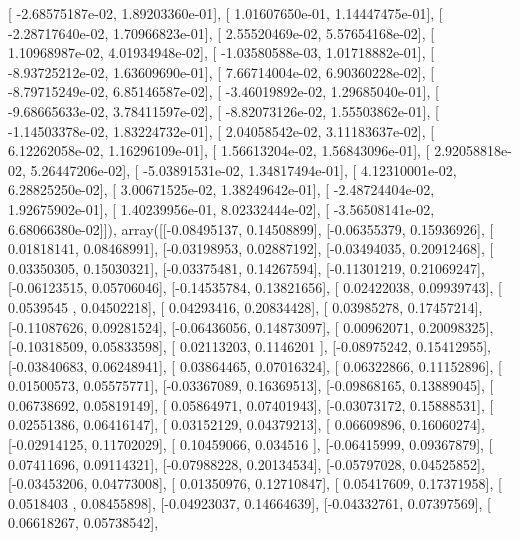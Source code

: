\documentclass{article}
\begin{document}
       [ -2.68575187e-02,   1.89203360e-01],
       [  1.01607650e-01,   1.14447475e-01],
       [ -2.28717640e-02,   1.70966823e-01],
       [  2.55520469e-02,   5.57654168e-02],
       [  1.10968987e-02,   4.01934948e-02],
       [ -1.03580588e-03,   1.01718882e-01],
       [ -8.93725212e-02,   1.63609690e-01],
       [  7.66714004e-02,   6.90360228e-02],
       [ -8.79715249e-02,   6.85146587e-02],
       [ -3.46019892e-02,   1.29685040e-01],
       [ -9.68665633e-02,   3.78411597e-02],
       [ -8.82073126e-02,   1.55503862e-01],
       [ -1.14503378e-02,   1.83224732e-01],
       [  2.04058542e-02,   3.11183637e-02],
       [  6.12262058e-02,   1.16296109e-01],
       [  1.56613204e-02,   1.56843096e-01],
       [  2.92058818e-02,   5.26447206e-02],
       [ -5.03891531e-02,   1.34817494e-01],
       [  4.12310001e-02,   6.28825250e-02],
       [  3.00671525e-02,   1.38249642e-01],
       [ -2.48724404e-02,   1.92675902e-01],
       [  1.40239956e-01,   8.02332444e-02],
       [ -3.56508141e-02,   6.68066380e-02]]), array([[-0.08495137,  0.14508899],
       [-0.06355379,  0.15936926],
       [ 0.01818141,  0.08468991],
       [-0.03198953,  0.02887192],
       [-0.03494035,  0.20912468],
       [ 0.03350305,  0.15030321],
       [-0.03375481,  0.14267594],
       [-0.11301219,  0.21069247],
       [-0.06123515,  0.05706046],
       [-0.14535784,  0.13821656],
       [ 0.02422038,  0.09939743],
       [ 0.0539545 ,  0.04502218],
       [ 0.04293416,  0.20834428],
       [ 0.03985278,  0.17457214],
       [-0.11087626,  0.09281524],
       [-0.06436056,  0.14873097],
       [ 0.00962071,  0.20098325],
       [-0.10318509,  0.05833598],
       [ 0.02113203,  0.1146201 ],
       [-0.08975242,  0.15412955],
       [-0.03840683,  0.06248941],
       [ 0.03864465,  0.07016324],
       [ 0.06322866,  0.11152896],
       [ 0.01500573,  0.05575771],
       [-0.03367089,  0.16369513],
       [-0.09868165,  0.13889045],
       [ 0.06738692,  0.05819149],
       [ 0.05864971,  0.07401943],
       [-0.03073172,  0.15888531],
       [ 0.02551386,  0.06416147],
       [ 0.03152129,  0.04379213],
       [ 0.06609896,  0.16060274],
       [-0.02914125,  0.11702029],
       [ 0.10459066,  0.034516  ],
       [-0.06415999,  0.09367879],
       [ 0.07411696,  0.09114321],
       [-0.07988228,  0.20134534],
       [-0.05797028,  0.04525852],
       [-0.03453206,  0.04773008],
       [ 0.01350976,  0.12710847],
       [ 0.05417609,  0.17371958],
       [ 0.0518403 ,  0.08455898],
       [-0.04923037,  0.14664639],
       [-0.04332761,  0.07397569],
       [ 0.06618267,  0.05738542],
\end{document}
